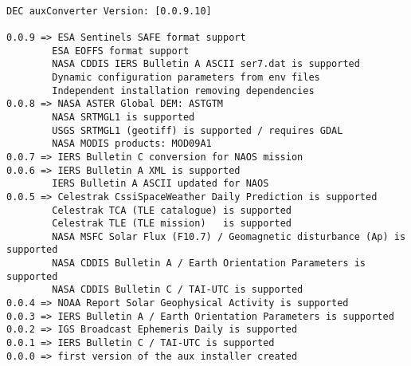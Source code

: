 \documentclass[dec_sum_main.tex]{subfiles}
\begin{document}
\begin{Verbatim}[tabsize=4]
    
DEC auxConverter Version: [0.0.9.10]

0.0.9 => ESA Sentinels SAFE format support
        ESA EOFFS format support
        NASA CDDIS IERS Bulletin A ASCII ser7.dat is supported
        Dynamic configuration parameters from env files
        Independent installation removing dependencies
0.0.8 => NASA ASTER Global DEM: ASTGTM
        NASA SRTMGL1 is supported
        USGS SRTMGL1 (geotiff) is supported / requires GDAL
        NASA MODIS products: MOD09A1
0.0.7 => IERS Bulletin C conversion for NAOS mission
0.0.6 => IERS Bulletin A XML is supported
        IERS Bulletin A ASCII updated for NAOS
0.0.5 => Celestrak CssiSpaceWeather Daily Prediction is supported
        Celestrak TCA (TLE catalogue) is supported
        Celestrak TLE (TLE mission)   is supported
        NASA MSFC Solar Flux (F10.7) / Geomagnetic disturbance (Ap) is supported
        NASA CDDIS Bulletin A / Earth Orientation Parameters is supported
        NASA CDDIS Bulletin C / TAI-UTC is supported
0.0.4 => NOAA Report Solar Geophysical Activity is supported
0.0.3 => IERS Bulletin A / Earth Orientation Parameters is supported
0.0.2 => IGS Broadcast Ephemeris Daily is supported
0.0.1 => IERS Bulletin C / TAI-UTC is supported
0.0.0 => first version of the aux installer created
\end{Verbatim}
\end{document}
